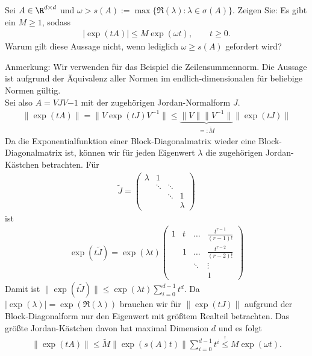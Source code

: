 \begin{exercise}
Sei $A \in \R^{d \times d}$ und $\omega > s(A) := \max \{\Re(\lambda): \lambda \in \sigma(A)\}$.
Zeigen Sie: Es gibt ein $M \geq 1$, sodass
\begin{align*}
  |\exp(tA)| \leq M\exp(\omega t), \qquad t \geq 0.
\end{align*}
Warum gilt diese Aussage nicht, wenn lediglich $\omega \geq s(A)$ gefordert wird?
\end{exercise}
\begin{solution}
Anmerkung: Wir verwenden für das Beispiel die Zeilensummennorm. Die Aussage ist
aufgrund der Äquivalenz aller Normen im endlich-dimensionalen für beliebige Normen gültig. \\
Sei also $A = VJV{-1}$ mit der zugehörigen Jordan-Normalform $J$.
\begin{align*}
  \|\exp(tA)\| = \|V\exp(tJ)V^{-1}\| \leq \underbrace{\|V\|\|V^{-1}\|}_{=:\widetilde{M}}\|\exp(tJ)\|
\end{align*}
Da die Exponentialfunktion einer Block-Diagonalmatrix wieder eine Block-Diagonalmatrix ist,
können wir für jeden Eigenwert $\lambda$ die zugehörigen Jordan-Kästchen betrachten.
Für
\begin{align*}
  \widetilde{J} = \begin{pmatrix}
    \lambda & 1 & & \\
    & \ddots & \ddots & \\
    & & \ddots & 1 \\
    & & & \lambda
  \end{pmatrix}
\end{align*}
ist
\begin{align*}
  \exp(t\widetilde{J}) = \exp(\lambda t)\begin{pmatrix}
    1 & t & \dots & \frac{t^{r-1}}{(r-1)!} \\
    & 1 & \dots & \frac{t^{r-2}}{(r-2)!} \\
    & & \ddots & \vdots \\
    & & & 1
  \end{pmatrix}
\end{align*}
Damit ist $\|\exp(t\widetilde{J})\| \leq \exp(\lambda t)\sum_{i=0}^{d-1} t^d$.
Da $|\exp(\lambda)| = \exp(\Re(\lambda))$ brauchen wir für $\|\exp(tJ)\|$
aufgrund der Block-Diagonalform nur den Eigenwert
mit größtem Realteil betrachten. Das größte Jordan-Kästchen davon hat maximal Dimension $d$
und es folgt
\begin{align*}
  \|\exp(tA)\| \leq \widetilde{M}\|\exp(s(A)t)\|\sum_{i=0}^{d-1} t^i \stackrel{!}{\leq} M \exp(\omega t).

\end{align*}
\end{solution}
